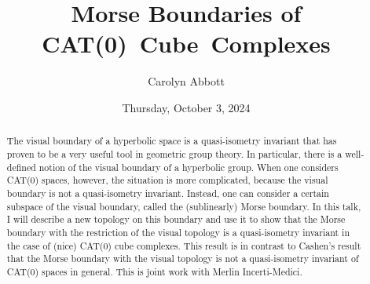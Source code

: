 \documentclass{UAmathtalk}
\author{Carolyn Abbott}
\title{Morse Boundaries of CAT(0)~Cube~Complexes}
\date{Thursday, October 3, 2024}
\begin{document}
\maketitle

\begin{abstract}
The visual boundary of a hyperbolic space is a quasi-isometry invariant that has proven to be a very useful tool in geometric group theory. In particular, there is a well-defined notion of the visual boundary of a hyperbolic group. When one considers CAT(0) spaces, however, the situation is more complicated, because the visual boundary is not a quasi-isometry invariant. Instead, one can consider a certain subspace of the visual boundary, called the (sublinearly) Morse boundary. In this talk, I will describe a new topology on this boundary and use it to show that the Morse boundary with the restriction of the visual topology is a quasi-isometry invariant in the case of (nice) CAT(0) cube complexes. This result is in contrast to Cashen’s result that the Morse boundary with the visual topology is not a quasi-isometry invariant of CAT(0) spaces in general. This is joint work with Merlin Incerti-Medici.
\end{abstract}
\end{document}
